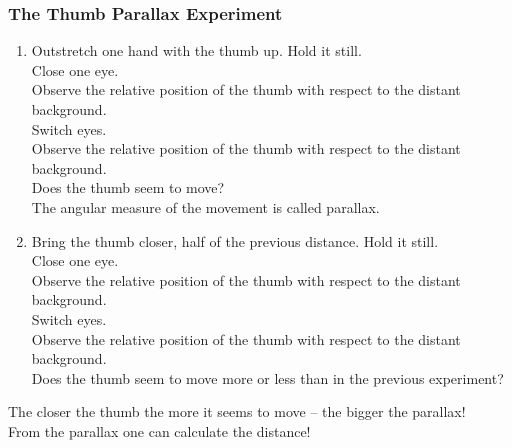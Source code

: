 \documentclass[aspectratio=169,xcolor=pdftex,dvipsnames]{beamer} %
\begin{document}
\begin{frame}
\frametitle{The Thumb Parallax Experiment}

\begin{enumerate}
\item
Outstretch one hand with the thumb up. Hold it still.\\
Close one eye.\\
Observe the relative position of the thumb with respect to the distant background.\\
Switch eyes.\\
Observe the relative position of the thumb with respect to the distant background.\\
Does the thumb seem to move?\\
The angular measure of the movement is called parallax.
\item
Bring the thumb closer, half of the previous distance. Hold it still.\\
Close one eye.\\
Observe the relative position of the thumb with respect to the distant background.\\
Switch eyes.\\
Observe the relative position of the thumb with respect to the distant background.\\
Does the thumb seem to move more or less than in the previous experiment?
\end{enumerate}

The closer the thumb the more it seems to move -- the bigger the parallax!\\ 
From the parallax one can calculate the distance!

\end{frame}
\end{document}

